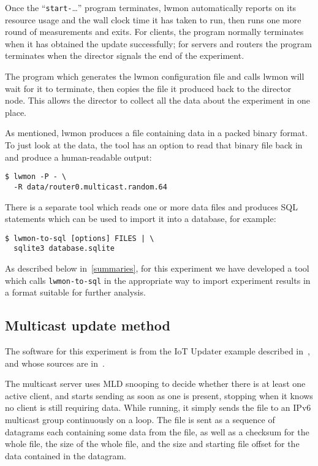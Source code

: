 \documentclass[a4paper,11pt,twocolumn]{article}
\begin{document}
Once the ``{\tt start-}\ldots'' program terminates, lwmon automatically
reports on its resource usage and the wall clock time it has taken to run,
then runs one more round of measurements and exits.  For clients, the
program normally terminates when it has obtained the update successfully;
for servers and routers the program terminates when the director signals
the end of the experiment.

The program which generates the lwmon configuration file and calls lwmon
will wait for it to terminate, then copies the file it produced back
to the director node. This allows the director to collect all the
data about the experiment in one place.

As mentioned, lwmon produces a file containing data in a packed binary
format. To just look at the data, the tool has an option to read that
binary file back in and produce a human-readable output:

\begin{small}
\begin{verbatim}
$ lwmon -P - \
  -R data/router0.multicast.random.64
\end{verbatim}
\end{small}

There is a separate tool which reads one or more data files and produces
SQL statements which can be used to import it into a database, for example:

\begin{small}
\begin{verbatim}
$ lwmon-to-sql [options] FILES | \
  sqlite3 database.sqlite
\end{verbatim}
\end{small}

As described below in~\ref{summaries}, for this experiment we have developed
a tool which calls {\tt lwmon-to-sql} in the appropriate way to import
experiment results in a format suitable for further analysis.

\subsection{Multicast update method}
\label{iotupd}

The software for this experiment is from the IoT Updater example described
in~\cite{iotupd:presentation}, and whose sources are in~\cite{iotupd:sources}.

The multicast server uses MLD snooping to decide whether there is at
least one active client, and starts sending as soon as one is present,
stopping when it knows no client is still requiring data. While running,
it simply sends the file to an IPv6 multicast group continuously on a
loop. The file is sent as a sequence of datagrams each containing some
data from the file, as well as a checksum for the whole file, the size
of the whole file, and the size and starting file offset for the data
contained in the datagram.
\end{document}
